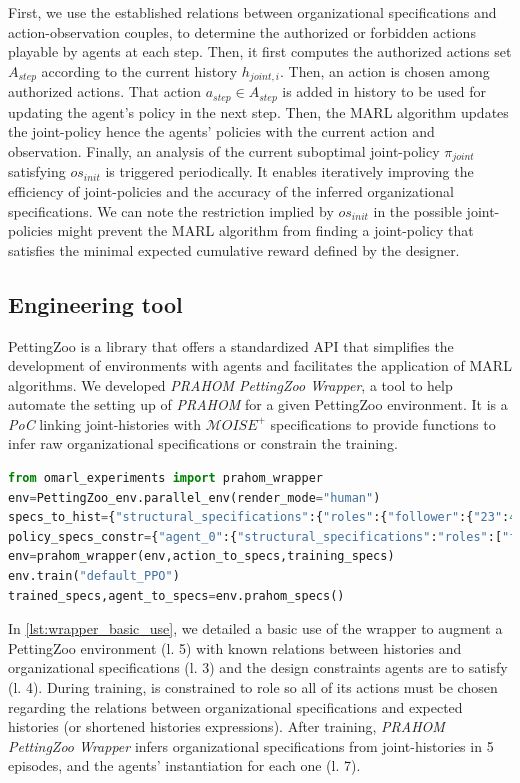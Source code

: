 First, we use the established relations between organizational specifications and action-observation couples, to determine the authorized or forbidden actions playable by agents at each step.
Then, it first computes the authorized actions set $A_{step}$ according to the current history $h_{joint,i}$. Then, an action is chosen among authorized actions. That action $a_{step} \in A_{step}$ is added in history to be used for updating the agent's policy in the next step. Then, the MARL algorithm updates the joint-policy hence the agents' policies with the current action and observation.
Finally, an analysis of the current suboptimal joint-policy $\pi_{joint}$ satisfying $os_{init}$ is triggered periodically. It enables iteratively improving the efficiency of joint-policies and the accuracy of the inferred organizational specifications.
We can note the restriction implied by $os_{init}$ in the possible joint-policies might prevent the MARL algorithm from finding a joint-policy that satisfies the minimal expected cumulative reward defined by the designer.

\subsection{Engineering tool}

PettingZoo is a library that offers a standardized API that simplifies the development of environments with agents and facilitates the application of MARL algorithms.
We developed \emph{PRAHOM PettingZoo Wrapper}\label{PettingZoo-wrapper}, a tool to help automate the setting up of \emph{PRAHOM} for a given PettingZoo environment.
It is a \emph{PoC} linking joint-histories with $\mathcal{M}OISE^+$ specifications to provide functions to infer raw organizational specifications or constrain the training. %
%
\begin{lstlisting}[language=Python, caption=PRAHOM PettingZoo Wrapper basic use, label={lst:wrapper_basic_use}]
from omarl_experiments import prahom_wrapper
env=PettingZoo_env.parallel_env(render_mode="human")
specs_to_hist={"structural_specifications":{"roles":{"follower":{"23":41,"14":[74,0]}}...},"functional_specifications":{"links":{"(leader,follower,aut)":".*14.*?89"}...}...}
policy_specs_constr={"agent_0":{"structural_specifications":"roles":["follower"]}}
env=prahom_wrapper(env,action_to_specs,training_specs)
env.train("default_PPO")
trained_specs,agent_to_specs=env.prahom_specs()
\end{lstlisting}
%
In \autoref{lst:wrapper_basic_use}, we detailed a basic use of the wrapper to augment a PettingZoo environment (l. 5) with known relations between histories and organizational specifications (l. 3) and the design constraints agents are to satisfy (l. 4).
During training,  is constrained to role  so all of its actions must be chosen regarding the relations between organizational specifications and expected histories (or shortened histories expressions).
After training, \emph{PRAHOM PettingZoo Wrapper} infers organizational specifications from joint-histories in 5 episodes, and the agents' instantiation for each one (l. 7).

